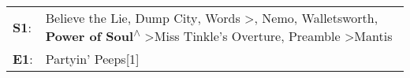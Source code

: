 \begin{supertabular}{p{0.03\textwidth}p{0.92\textwidth}}
 \textbf{S1}:  &  Believe the Lie\textsuperscript{}, \enspace Dump City\textsuperscript{}, \enspace Words\textsuperscript{} \textgreater {}\textsuperscript{}, \enspace Nemo\textsuperscript{}, \enspace Walletsworth\textsuperscript{}, \enspace \textbf{Power of Soul\textsuperscript{$\wedge$}} \textgreater \enspace Miss Tinkle's Overture\textsuperscript{}, \enspace Preamble\textsuperscript{} \textgreater \enspace Mantis\textsuperscript{}  \enspace  \\
 \textbf{E1}:  &                                                                                                                                                                                                                                                                                                                                                                                                             Partyin' Peeps[1]\textsuperscript{}  \enspace  \\
\end{supertabular}
